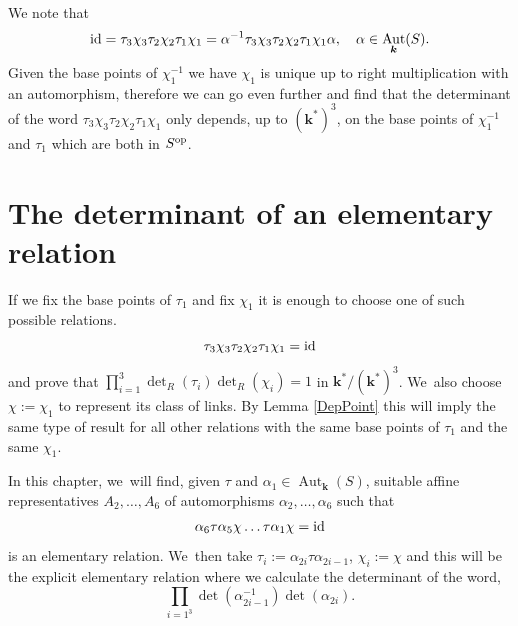 \documentclass[JEP,XML,SOM,Unicode,NoFloatCountersInSection, NoEqCountersInSection,published]{cedram}
\newcommand{\id}{\textup{id}}
\newcommand{\op}{\textup{op}}
\theoremstyle{definition}
\newcommand{\kk}{{\boldsymbol{k}}}
\DeclareMathOperator{\Aut}{Aut}
\begin{document}
We note that
\[
\id = \tau_3\chi_3\tau_2\chi_2\tau_1\chi_1 = \alpha^{-1}\tau_3\chi_3\tau_2\chi_2\tau_1\chi_1 \alpha, \quad\alpha \in \Aut_{\kk}(S).
\]
Given the base points of $\chi_1^{-1}$ we have $\chi_1$ is unique up to right multiplication with an automorphism, therefore we can go even further and find that the determinant of the word $\tau_3 \chi_3 \tau_2\chi_2 \tau_1 \chi_1$ only depends, up to $(\kk^*)^3$, on the base points of $\chi_1^{-1}$ and $\tau_1$ which are both in $S^{\op}$.

\section{The determinant of an elementary relation} \label{Sec5}
If we fix the base points of $\tau_1$ and fix $\chi_1$ it is enough to choose one of such possible relations.
\[
\tau_3\chi_3\tau_2\chi_2\tau_1\chi_1 = \id
\]
and prove that $\prod_{i=1}^3 \det_R(\tau_i)\det_R(\chi_i) = 1$ in $\kk^* /(\kk^*)^3$. We~also choose $\chi:= \chi_1$ to represent its class of links. By Lemma \ref{DepPoint} this will imply the same type of result for all other relations with the same base points of $\tau_1$ and the same $\chi_1$.

In this chapter, we~will find, given $\tau$ and $\alpha_1 \in \Aut_{\kk}(S)$, suitable affine representatives $A_2, \dots , A_6$ of automorphisms $\alpha_2, \dots , \alpha_6$ such that
\begin{equation} \label{eq: exaRel}
\alpha_6 \tau \alpha_5 \chi \dots \tau \alpha_1 \chi = \id
\end{equation}
is an elementary relation. We~then take $\tau_i := \alpha_{2i} \tau \alpha_{2i-1}$, $\chi_i:= \chi$ and this will be the explicit elementary relation where we calculate the determinant of the word, \ie
\[
\prod_{i=1^3}\det(\alpha_{2i - 1}^{-1})\det(\alpha_{2i}).
\]
\end{document}
